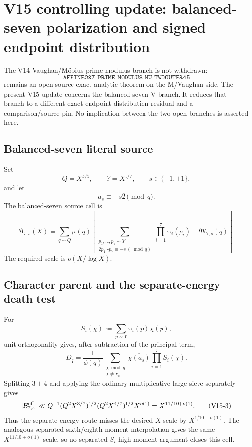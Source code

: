 \section*{V15 controlling update: balanced-seven polarization and signed endpoint distribution}

\begin{status}
The V14 Vaughan/M\"obius prime-modulus branch is not withdrawn:
\[
 \texttt{AFFINE287-PRIME-MODULUS-MU-TWOOUTER45}
\]
remains an open source-exact analytic theorem on the M/Vaughan side.
The present V15 update concerns the balanced-seven V-branch.  It reduces that branch to a
different exact endpoint-distribution residual and a comparison/source pin.  No implication
between the two open branches is asserted here.
\end{status}

\subsection*{Balanced-seven literal source}

Set
\[
 Q=X^{3/5},\qquad Y=X^{1/7},\qquad s\in\{-1,+1\},
\]
and let
\[
 a_s\equiv -s\overline 2\pmod q.
\]
The balanced-seven source cell is
\[
 \mathcal B_{7,s}(X)
 =
 \sum_{q\sim Q}\mu(q)
 \left[
   \sum_{\substack{p_1,\ldots,p_7\sim Y\\
                   2p_1\cdots p_7\equiv -s\;(\bmod q)}}
   \prod_{i=1}^{7}\omega_i(p_i)
   -\mathfrak M_{7,s}(q)
 \right].
 \tag{V15-1}
\]
The required scale is $o(X/\log X)$.

\subsection*{Character parent and the separate-energy death test}

For
\[
 S_i(\chi):=\sum_{p\sim Y}\omega_i(p)\chi(p),
\]
unit orthogonality gives, after subtraction of the principal term,
\[
 D_q
 =
 \frac1{\phi(q)}
 \sum_{\substack{\chi\bmod q\\ \chi\neq\chi_0}}
 \overline{\chi(a_s)}\prod_{i=1}^{7}S_i(\chi).
 \tag{V15-2}
\]
Splitting $3+4$ and applying the ordinary multiplicative large sieve separately gives
\[
 |\mathcal B_{7,s}^{\rm off}|
 \ll
 Q^{-1}(Q^2X^{3/7})^{1/2}(Q^2X^{4/7})^{1/2}X^{o(1)}
 =
 X^{11/10+o(1)}.
 \tag{V15-3}
\]
Thus the separate-energy route misses the desired $X$ scale by $X^{1/10-o(1)}$.
The analogous separated sixth/eighth moment interpolation gives the same $X^{11/10+o(1)}$
scale, so no separated-$S_i$ high-moment argument closes this cell.

